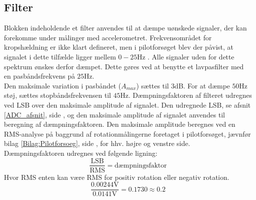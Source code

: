 \subsection{Filter}\label{FilterAfs}
Blokken indeholdende et filter anvendes til at dæmpe uønskede signaler, der kan forekomme under målinger med accelerometret. Frekvensområdet for kropshældning er ikke klart defineret, men i pilotforsøget blev der påvist, at signalet i dette tilfælde ligger mellem $0-25$Hz \cite{Martinez-Mendez2011}. Alle signaler uden for dette spektrum ønskes derfor dæmpet. Dette gøres ved at benytte et lavpasfilter med en pasbåndsfrekvens på $25$Hz. \\
Den maksimale variation i pasbåndet ($A_{max}$) sættes til $3$dB. For at dæmpe $50$Hz støj, sættes stopbåndsfrekvensen til $45$Hz. Dæmpningsfaktoren af filteret udregnes ved LSB over den maksimale amplitude af signalet. %
Den udregnede LSB, se afsnit \ref{ADC_afsnit}, side \pageref{ADC_afsnit}, og den maksimale amplitude af signalet anvendes til beregning af dæmpningsfaktoren. Den maksimale amplitude beregnes ved en RMS-analyse på baggrund af rotationmålingerne foretaget i pilotforsøget, jævnfør bilag \ref{Bilag:Pilotforsoeg}, side \pageref{Bilag:Pilotforsoeg}, for hhv. højre og venstre side. Dæmpningsfaktoren udregnes ved følgende ligning:
\begin{equation}
\dfrac{\text{LSB}}{\text{RMS}} = \text{dæmpningsfaktor}
\end{equation}
Hvor RMS enten kan være RMS for positiv rotation eller negativ rotation.
\begin{equation}
\label{eq:daempningsfaktor}
\dfrac{0.00244\text{V}}{0.0141\text{V}} = 0.1730 \approx 0.2 
\end{equation}
